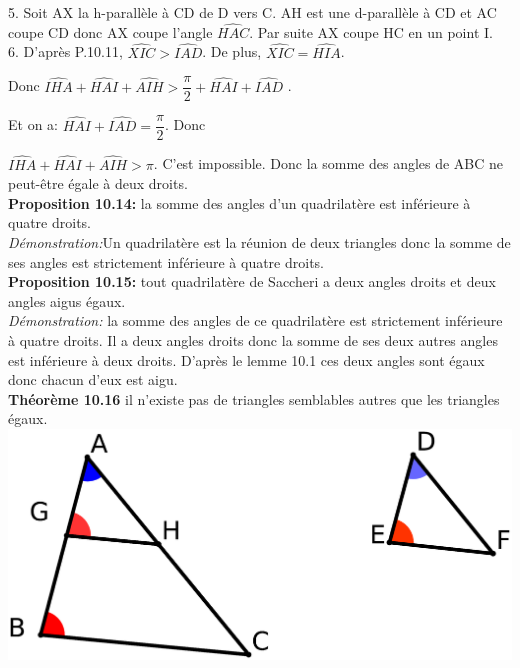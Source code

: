 \documentclass[a4paper, 12pt, twoside]{book}
\begin{document}
5. Soit AX la h-parallèle à CD de D vers C. AH est une d-parallèle à CD et AC coupe CD donc AX coupe l'angle $\hat{HAC}$. Par suite AX coupe HC en un point I. \\

6. D'après P.10.11, $\hat{XIC}>\hat{IAD}$. De plus, $\hat{XIC}=\hat{HIA}$.\

Donc $\hat{IHA}+\hat{HAI}+\hat{AIH}>\dfrac{\pi}{2}+\hat{HAI}+\hat{IAD}$  .\

Et on a: $\hat{HAI}+\hat{IAD}=\dfrac{\pi}{2}$. Donc \ 

$\hat{IHA}+\hat{HAI}+\hat{AIH}>\pi$. C'est impossible. Donc la somme des angles de ABC ne peut-être égale à deux droits.\\

\textbf{Proposition 10.14:} la somme des angles d'un quadrilatère est inférieure à quatre droits.\\

\textit{Démonstration:}Un quadrilatère  est la réunion de deux triangles donc la somme de ses angles est strictement inférieure à quatre droits.\\


\textbf{Proposition 10.15:}  tout quadrilatère de Saccheri a deux angles droits et deux angles aigus égaux.\\

\textit{Démonstration:} la somme des  angles de ce quadrilatère est strictement inférieure à quatre droits. Il a deux angles droits donc la somme de ses deux autres angles est inférieure à deux droits. D'après le lemme 10.1 ces deux angles sont égaux donc chacun d'eux est aigu.\\


\textbf{Théorème 10.16} il n'existe pas de triangles semblables autres que les triangles égaux.\\

 \includegraphics[scale=0.1]{figures/Lobat25.eps}\\
 
\end{document}
